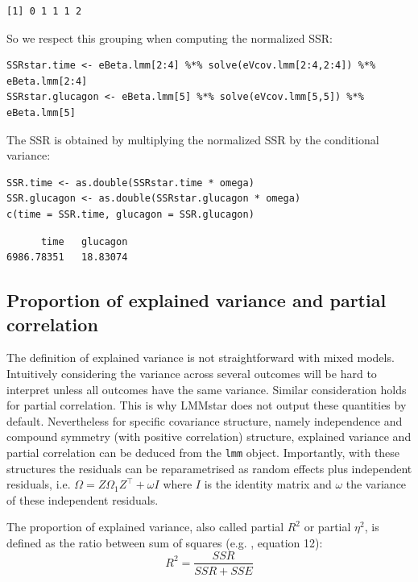 \documentclass[12pt]{article}
\newcommand\Warning[1][3ex]{%
\renewcommand\stacktype{L}%
\scaleto{\stackon[1.3pt]{\color{red}$\triangle$}{\tiny\bfseries !}}{#1}%
\xspace
}
\newcommand\trans[1]{{#1}^\intercal}%
\begin{document}
\begin{verbatim}
[1] 0 1 1 1 2
\end{verbatim}


\clearpage

So we respect this grouping when computing the normalized SSR: 
\lstset{language=r,label= ,caption= ,captionpos=b,numbers=none}
\begin{lstlisting}
SSRstar.time <- eBeta.lmm[2:4] %*% solve(eVcov.lmm[2:4,2:4]) %*% eBeta.lmm[2:4] 
SSRstar.glucagon <- eBeta.lmm[5] %*% solve(eVcov.lmm[5,5]) %*% eBeta.lmm[5] 
\end{lstlisting}
The SSR is obtained by multiplying the normalized SSR by the
conditional variance:
\lstset{language=r,label= ,caption= ,captionpos=b,numbers=none}
\begin{lstlisting}
SSR.time <- as.double(SSRstar.time * omega)
SSR.glucagon <- as.double(SSRstar.glucagon * omega)
c(time = SSR.time, glucagon = SSR.glucagon)
\end{lstlisting}
\begin{verbatim}
      time   glucagon 
6986.78351   18.83074
\end{verbatim}

\subsection{Proportion of explained variance and partial correlation}
\label{sec:org492ad78}

\Warning The definition of explained variance is not straightforward
with mixed models. Intuitively considering the variance across several
outcomes will be hard to interpret unless all outcomes have the same
variance. Similar consideration holds for partial correlation. This
is why LMMstar does not output these quantities by
default. Nevertheless for specific covariance structure, namely
independence and compound symmetry (with positive correlation)
structure, explained variance and partial correlation can be deduced
from the \texttt{lmm} object. Importantly, with these structures the
residuals can be reparametrised as random effects plus independent
residuals, i.e. \(\Omega = Z \Omega_1 \trans{Z} + \omega I\) where
\(I\) is the identity matrix and \(\omega\) the variance of these
independent residuals.

\bigskip

The proportion of explained variance, also called partial \(R^2\) or
partial \(\eta^2\), is defined as the ratio between sum of squares
(e.g. \cite{lakens2013calculating}, equation 12):
\[ R^2=\frac{SSR}{SSR + SSE} \]
\end{document}
